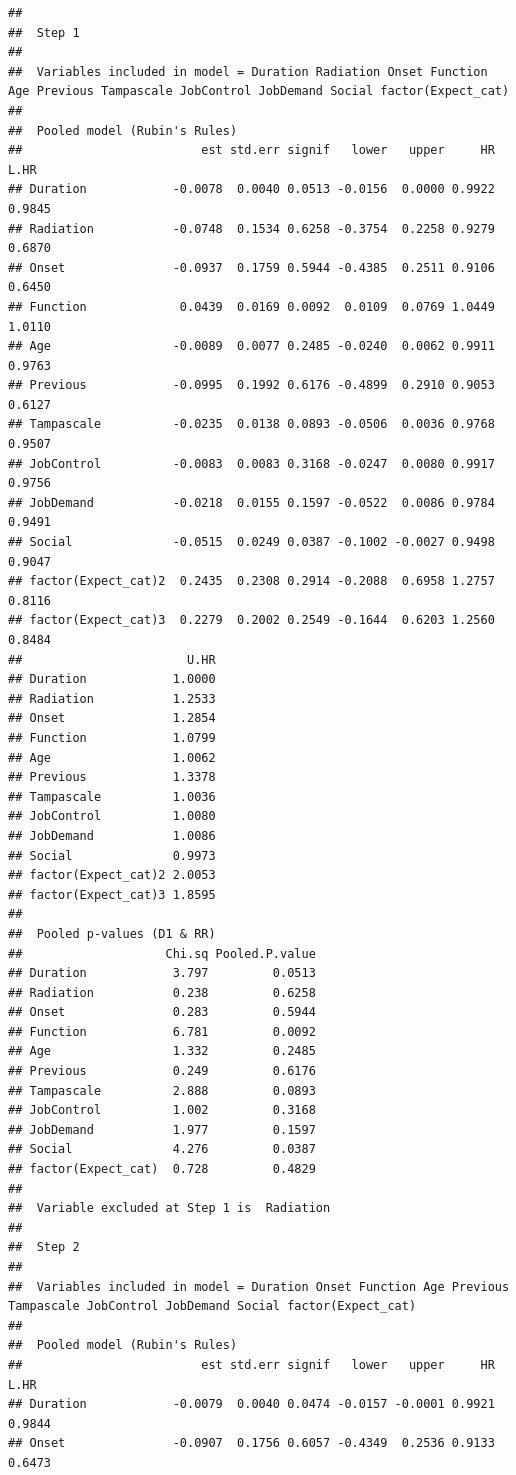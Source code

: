 \documentclass[]{book}
\begin{document}
\begin{verbatim}
## 
##  Step 1 
## 
##  Variables included in model = Duration Radiation Onset Function Age Previous Tampascale JobControl JobDemand Social factor(Expect_cat) 
## 
##  Pooled model (Rubin's Rules) 
##                         est std.err signif   lower   upper     HR   L.HR
## Duration            -0.0078  0.0040 0.0513 -0.0156  0.0000 0.9922 0.9845
## Radiation           -0.0748  0.1534 0.6258 -0.3754  0.2258 0.9279 0.6870
## Onset               -0.0937  0.1759 0.5944 -0.4385  0.2511 0.9106 0.6450
## Function             0.0439  0.0169 0.0092  0.0109  0.0769 1.0449 1.0110
## Age                 -0.0089  0.0077 0.2485 -0.0240  0.0062 0.9911 0.9763
## Previous            -0.0995  0.1992 0.6176 -0.4899  0.2910 0.9053 0.6127
## Tampascale          -0.0235  0.0138 0.0893 -0.0506  0.0036 0.9768 0.9507
## JobControl          -0.0083  0.0083 0.3168 -0.0247  0.0080 0.9917 0.9756
## JobDemand           -0.0218  0.0155 0.1597 -0.0522  0.0086 0.9784 0.9491
## Social              -0.0515  0.0249 0.0387 -0.1002 -0.0027 0.9498 0.9047
## factor(Expect_cat)2  0.2435  0.2308 0.2914 -0.2088  0.6958 1.2757 0.8116
## factor(Expect_cat)3  0.2279  0.2002 0.2549 -0.1644  0.6203 1.2560 0.8484
##                       U.HR
## Duration            1.0000
## Radiation           1.2533
## Onset               1.2854
## Function            1.0799
## Age                 1.0062
## Previous            1.3378
## Tampascale          1.0036
## JobControl          1.0080
## JobDemand           1.0086
## Social              0.9973
## factor(Expect_cat)2 2.0053
## factor(Expect_cat)3 1.8595
## 
##  Pooled p-values (D1 & RR) 
##                    Chi.sq Pooled.P.value
## Duration            3.797         0.0513
## Radiation           0.238         0.6258
## Onset               0.283         0.5944
## Function            6.781         0.0092
## Age                 1.332         0.2485
## Previous            0.249         0.6176
## Tampascale          2.888         0.0893
## JobControl          1.002         0.3168
## JobDemand           1.977         0.1597
## Social              4.276         0.0387
## factor(Expect_cat)  0.728         0.4829
## 
##  Variable excluded at Step 1 is  Radiation 
## 
##  Step 2 
## 
##  Variables included in model = Duration Onset Function Age Previous Tampascale JobControl JobDemand Social factor(Expect_cat) 
## 
##  Pooled model (Rubin's Rules) 
##                         est std.err signif   lower   upper     HR   L.HR
## Duration            -0.0079  0.0040 0.0474 -0.0157 -0.0001 0.9921 0.9844
## Onset               -0.0907  0.1756 0.6057 -0.4349  0.2536 0.9133 0.6473

\end{verbatim}
\end{document}
